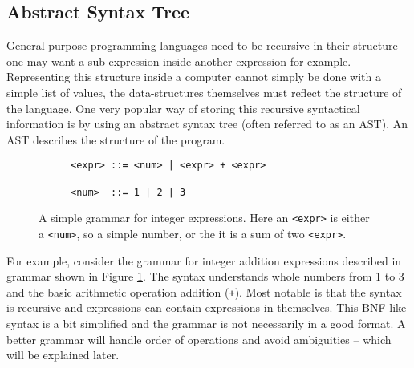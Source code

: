 \subsection{Abstract Syntax Tree}
General purpose programming languages need to be recursive in their structure -- one may want a sub-expression inside another expression for example. Representing this structure inside a computer cannot simply be done with a simple list of values, the data-structures themselves must reflect the structure of the language. One very popular way of storing this recursive syntactical information is by using an abstract syntax tree (often referred to as an AST). An AST describes the structure of the program.


\begin{figure}[h!]
\centering
\begin{subfigure}{.5\textwidth}
  \begin{verbatim}
<expr> ::= <num> | <expr> + <expr>

<num>  ::= 1 | 2 | 3
\end{verbatim}
\end{subfigure}
  \cprotect\caption{A simple grammar for integer expressions. Here an \verb|<expr>| is either a \verb|<num>|, so a simple number, or the it is a sum of two \verb|<expr>|.}
  \label{fig:bnfExpr}
\end{figure}
For example, consider the grammar for integer addition expressions described in grammar shown in Figure \ref{fig:bnfExpr}. The syntax understands whole numbers from 1 to 3 and the basic arithmetic operation addition (\verb!+!). Most notable is that the syntax is recursive and expressions can contain expressions in themselves. This BNF-like syntax is a bit simplified and the grammar is not necessarily in a good format. A better grammar will handle order of operations and avoid ambiguities -- which will be explained later.

